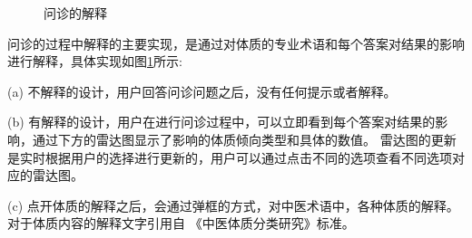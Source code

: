 \begin{figure}[htbp]
    \caption{问诊的解释} 
    \label{fig:questions}
\end{figure}

问诊的过程中解释的主要实现，是通过对体质的专业术语和每个答案对结果的影响进行解释，具体实现如图\ref{fig:questions}所示:

(a) 不解释的设计，用户回答问诊问题之后，没有任何提示或者解释。

(b) 有解释的设计，用户在进行问诊过程中，可以立即看到每个答案对结果的影响，通过下方的雷达图显示了影响的体质倾向类型和具体的数值。
雷达图的更新是实时根据用户的选择进行更新的，用户可以通过点击不同的选项查看不同选项对应的雷达图。

(c) 点开体质的解释之后，会通过弹框的方式，对中医术语中，各种体质的解释。对于体质内容的解释文字引用自 《中医体质分类研究》标准。



